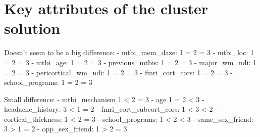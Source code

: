 \documentclass[
  letterpaper,
  DIV=11,
  numbers=noendperiod]{scrreprt}
\newenvironment{Shaded}{\begin{snugshade}}{\end{snugshade}}
\newcommand{\AttributeTok}[1]{\textcolor[rgb]{0.40,0.45,0.13}{#1}}
\newcommand{\CommentTok}[1]{\textcolor[rgb]{0.37,0.37,0.37}{#1}}
\newcommand{\ConstantTok}[1]{\textcolor[rgb]{0.56,0.35,0.01}{#1}}
\newcommand{\DecValTok}[1]{\textcolor[rgb]{0.68,0.00,0.00}{#1}}
\newcommand{\FunctionTok}[1]{\textcolor[rgb]{0.28,0.35,0.67}{#1}}
\newcommand{\NormalTok}[1]{\textcolor[rgb]{0.00,0.23,0.31}{#1}}
\newcommand{\OtherTok}[1]{\textcolor[rgb]{0.00,0.23,0.31}{#1}}
\newcommand{\SpecialCharTok}[1]{\textcolor[rgb]{0.37,0.37,0.37}{#1}}
\newcommand{\StringTok}[1]{\textcolor[rgb]{0.13,0.47,0.30}{#1}}
\begin{document}
\begin{Shaded}
\end{Shaded}

\section{Key attributes of the cluster
solution}\label{key-attributes-of-the-cluster-solution}

Doesn't seem to be a big difference: - mtbi\_mem\_daze: 1 = 2 = 3 -
mtbi\_loc: 1 = 2 = 3 - mtbi\_age: 1 = 2 = 3 - previous\_mtbis: 1 = 2 = 3
- major\_wm\_ndi: 1 = 2 = 3 - pericortical\_wm\_ndi: 1 = 2 = 3 -
fmri\_cort\_cors: 1 = 2 = 3 - school\_programs: 1 = 2 = 3

Small difference: - mtbi\_mechanism 1 \textless{} 2 = 3 - age 1 = 2
\textless{} 3 - headache\_history: 3 \textless{} 1 = 2 -
fmri\_cort\_subcort\_cors: 1 \textless{} 3 \textless{} 2 -
cortical\_thickness: 1 \textless{} 2 = 3 - school\_programs: 1
\textless{} 2 \textless{} 3 - same\_sex\_friend: 3 \textgreater{} 1 = 2
- opp\_sex\_friend: 1 \textgreater{} 2 = 3
\end{document}
